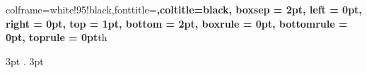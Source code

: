 \newcommand{\xo}{\raisebox{0.4ex}{\textbf{$\chi$}}\xspace}
\newcommand{\xod}{{{\xo}-embodied}\xspace}
\newcommand{\xot}{{{\xo}-embodiment}\xspace}
\newcommand{\ours}{{\small$\textsf{{X}-RSecure}$}\xspace}
\newcommand{\BfPara}[1]{{\noindent\bfseries\an{#1}.}\xspace}
\newcommand{\BfParaUL}[1]{{\noindent\ul{\textbf{#1}.}}\xspace}
\newcommand{\dd}{\Circle}
\newcommand{\vv}{\CIRCLE}
\newcommand{\bb}{\RIGHTcircle}
\newcommand{\ee}{$\cdot$}
\newcommand{\BfParaC}[1]{{\vspace{1ex}\noindent\bfseries{\capitalisewords{#1}.}\xspace}}

\newcommand{\todo}[1]{\textcolor{blue}{[$\rightarrow$#1]}}
\newcommand{\mo}[1]{\textcolor{red!85!black}{#1}}
\usepackage{txfonts}
\renewcommand{\rmdefault}{txr}

\usepackage{tcolorbox}


% 


%
{colframe=white!95!black,fonttitle=\bfseries,coltitle=black, boxsep = 2pt, left = 0pt, right = 0pt, top = 1pt, bottom = 2pt, boxrule = 0pt, bottomrule = 0pt, toprule = 0pt}{th}{}


%
{\topsep}%
{\topsep}%
{}%
{3pt}%
{\bfseries}%
{.}%
{3pt}%
{}%
\theoremstyle{styledef}


\newcommand{\observationdef}[2][0.97\textwidth]{
  \vspace{2ex}\par\noindent\tikzstyle{mybox} = [fill=gray!10,
   thick,rectangle,inner sep=6pt,path picture={\fill [white!40!black] ([xshift=-8.1cm]path picture bounding box.north) rectangle (path picture bounding box.south west);}]
  \begin{tikzpicture}
  \centering
   \node [mybox] (box){%
    \begin{minipage}{#1}{ #2}\end{minipage}
   };
  \end{tikzpicture}
}

\setlength{\baselineskip}{12.6pt} %
\setlength{\normalbaselineskip}{12.6pt} %

\usetikzlibrary{positioning}


\usepackage{caption}
\captionsetup[figure]{font=small}
\captionsetup[table]{font=small}



